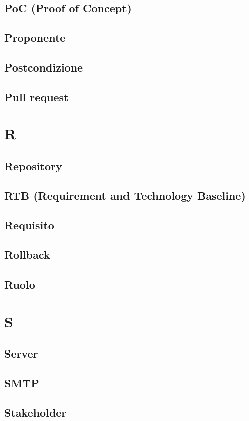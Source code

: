\documentclass[12pt]{article}
\begin{document}
		\subsection{PoC (Proof of Concept)}
		\subsection{Proponente}
		\subsection{Postcondizione}
		\subsection{Pull request}
	\clearpage
	\section{R}
		\subsection{Repository}
		\subsection{RTB (Requirement and Technology Baseline)}
		\subsection{Requisito}
		\subsection{Rollback}
		\subsection{Ruolo}
	\clearpage
	\section{S}
		\subsection{Server}
		\subsection{SMTP}
		\subsection{Stakeholder}
\end{document}
